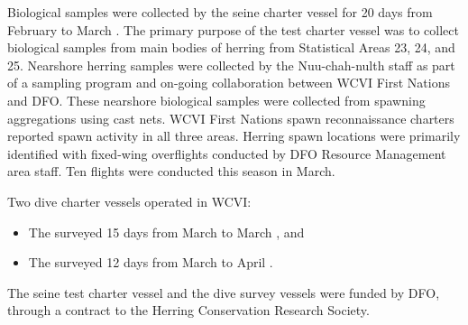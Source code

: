 Biological samples were collected by the seine charter vessel 
for 20 days from February  to March .
The primary purpose of the test charter vessel was to
collect biological samples from main bodies of herring from Statistical Areas 23, 24, and 25.
Nearshore herring samples were collected by the Nuu-chah-nulth staff as
part of a sampling program and on-going collaboration between WCVI First Nations and DFO.
These nearshore biological samples were collected from spawning aggregations using cast nets.
WCVI First Nations spawn reconnaissance charters reported spawn activity in all three areas.
Herring spawn locations were primarily identified with fixed-wing overflights conducted by
DFO Resource Management area staff.
Ten flights were conducted this season in March.

Two dive charter vessels operated in WCVI:

\begin{itemize}

\item The  surveyed 15 days from March  to March , and

\item The  surveyed 12 days from March  to April .

\end{itemize}

The seine test charter vessel and the dive survey vessels were funded by DFO,
through a contract to the Herring Conservation Research Society.
